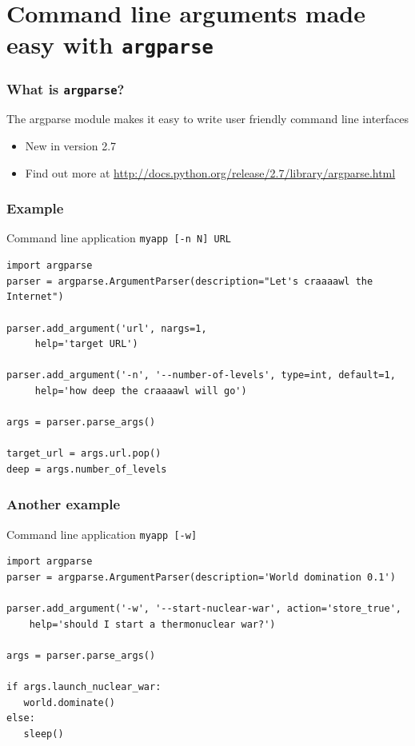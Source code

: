 \documentclass[11pt]{beamer}
\begin{document}
\section{Command line arguments made easy with \texttt{argparse}}
\label{sec-4}
\begin{frame}[fragile]\frametitle{What is \texttt{argparse}?}
\label{sec-4_1}


The argparse module makes it easy to write user friendly command line interfaces
\begin{itemize}
\item New in version 2.7
\item Find out more at
   \href{http://docs.python.org/release/2.7/library/argparse.html}{http://docs.python.org/release/2.7/library/argparse.html}
\end{itemize}
\end{frame}
\begin{frame}[fragile]\frametitle{Example}
\label{sec-4_2}


Command line application \texttt{myapp [-n N] URL}

\begin{lstlisting}
import argparse
parser = argparse.ArgumentParser(description="Let's craaaawl the Internet")

parser.add_argument('url', nargs=1,
     help='target URL')

parser.add_argument('-n', '--number-of-levels', type=int, default=1,
     help='how deep the craaaawl will go')

args = parser.parse_args()

target_url = args.url.pop()
deep = args.number_of_levels
\end{lstlisting}
\end{frame}
\begin{frame}[fragile]\frametitle{Another example}
\label{sec-4_3}


Command line application \texttt{myapp [-w]}

\begin{lstlisting}
import argparse
parser = argparse.ArgumentParser(description='World domination 0.1')

parser.add_argument('-w', '--start-nuclear-war', action='store_true',
    help='should I start a thermonuclear war?')

args = parser.parse_args()

if args.launch_nuclear_war:
   world.dominate()
else:
   sleep()

\end{lstlisting}
\end{frame}
\end{document}
